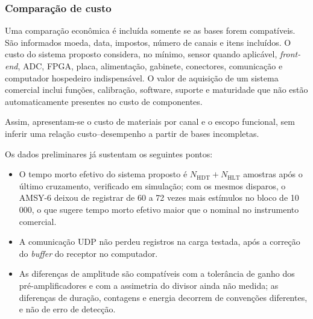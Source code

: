 \subsubsection{Comparação de custo}
Uma comparação econômica é incluída somente se as bases forem compatíveis. São informados moeda, data, impostos, número de canais e itens incluídos. O custo do sistema proposto considera, no mínimo, sensor quando aplicável, \textit{front-end}, ADC, FPGA, placa, alimentação, gabinete, conectores, comunicação e computador hospedeiro indispensável. O valor de aquisição de um sistema comercial inclui funções, calibração, software, suporte e maturidade que não estão automaticamente presentes no custo de componentes.

Assim, apresentam-se o custo de materiais por canal e o escopo funcional, sem inferir uma relação custo--desempenho a partir de bases incompletas.

Os dados preliminares já sustentam os seguintes pontos:
\begin{itemize}
	\item O tempo morto efetivo do sistema proposto é \(N_{\mathrm{HDT}} + N_{\mathrm{HLT}}\) amostras após o último cruzamento, verificado em simulação; com os mesmos disparos, o AMSY-6 deixou de registrar de 60 a 72 vezes mais estímulos no bloco de 10\,000, o que sugere tempo morto efetivo maior que o nominal no instrumento comercial.
	\item A comunicação UDP não perdeu registros na carga testada, após a correção do \textit{buffer} do receptor no computador.
	\item As diferenças de amplitude são compatíveis com a tolerância de ganho dos pré-amplificadores e com a assimetria do divisor ainda não medida; as diferenças de duração, contagens e energia decorrem de convenções diferentes, e não de erro de detecção.
\end{itemize}

